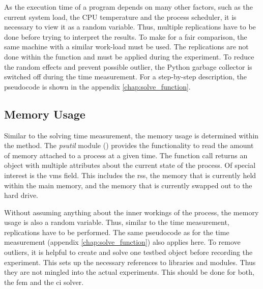 \documentclass[./\jobname.tex]{subfiles}
\begin{document}
As the execution time of a program depends on many other factors, such as the current system load, the CPU temperature and the process scheduler, it is necessary to view it as a random variable. Thus, multiple replications have to be done before trying to interpret the results. To make for a fair comparison, the same machine with a similar work-load must be used.  The replications are not done within the  function and must be applied during the experiment. To reduce the random effects and prevent possible outlier, the Python garbage collector is switched off during the time measurement. For a step-by-step description, the pseudocode is shown in the appendix \ref{chap:solve_function}. 



\subsection{Memory Usage}
\label{chap:metric_mem}
Similar to the solving time measurement, the memory usage is determined within the  method. The \textit{psutil} module (\cite{rodola_psutil_2020}) provides the functionality to read the amount of memory attached to a process at a given time. The function call  returns an object with multiple attributes about the current state of the process. Of special interest is the \gls{vms} field. This includes the \gls{rss}, the memory that is currently held within the main memory, and the memory that is currently swapped out to the hard drive.

Without assuming anything about the inner workings of the process, the memory usage is also a random variable. Thus, similar to the time measurement, replications have to be performed. The same pseudocode as for the time measurement (appendix \ref{chap:solve_function}) also applies here. To remove outliers, it is helpful to create and solve one testbed object before recording the experiment. This sets up the necessary references to libraries and modules. Thus they are not mingled into the actual experiments. This should be done for both, the \gls{fem} and the \gls{ci} solver.  
\end{document}
